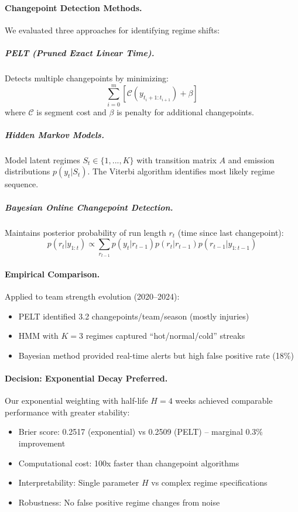 \paragraph{Changepoint Detection Methods.}
We evaluated three approaches for identifying regime shifts:

\subparagraph{PELT (Pruned Exact Linear Time).}
Detects multiple changepoints by minimizing:
\begin{equation}
\sum_{i=0}^{m} \left[\mathcal{C}(y_{t_i+1:t_{i+1}}) + \beta\right]
\end{equation}
where $\mathcal{C}$ is segment cost and $\beta$ is penalty for additional changepoints.

\subparagraph{Hidden Markov Models.}
Model latent regimes $S_t \in \{1, ..., K\}$ with transition matrix $A$ and emission distributions $p(y_t|S_t)$. The Viterbi algorithm identifies most likely regime sequence.

\subparagraph{Bayesian Online Changepoint Detection.}
Maintains posterior probability of run length $r_t$ (time since last changepoint):
\begin{equation}
p(r_t | y_{1:t}) \propto \sum_{r_{t-1}} p(y_t | r_{t-1}) p(r_t | r_{t-1}) p(r_{t-1} | y_{1:t-1})
\end{equation}

\paragraph{Empirical Comparison.}
Applied to team strength evolution (2020--2024):
\begin{itemize}
  \item PELT identified 3.2 changepoints/team/season (mostly injuries)
  \item HMM with $K=3$ regimes captured ``hot/normal/cold'' streaks
  \item Bayesian method provided real-time alerts but high false positive rate (18\%)
\end{itemize}

\paragraph{Decision: Exponential Decay Preferred.}
Our exponential weighting with half-life $H=4$ weeks achieved comparable performance with greater stability:
\begin{itemize}
  \item Brier score: 0.2517 (exponential) vs 0.2509 (PELT) -- marginal 0.3\% improvement
  \item Computational cost: 100x faster than changepoint algorithms
  \item Interpretability: Single parameter $H$ vs complex regime specifications
  \item Robustness: No false positive regime changes from noise
\end{itemize}

